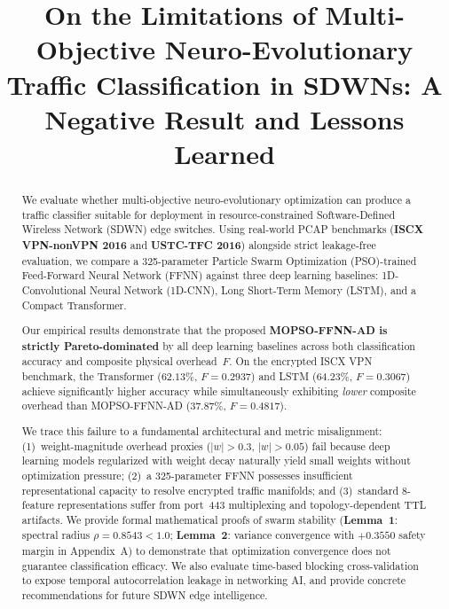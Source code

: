 \documentclass[journal]{IEEEtran}
\begin{document}
\title{On the Limitations of Multi-Objective Neuro-Evolutionary Traffic
Classification in SDWNs: A Negative Result and Lessons Learned}

\author{
}

\maketitle

\begin{abstract}
We evaluate whether multi-objective neuro-evolutionary optimization can produce
a traffic classifier suitable for deployment in resource-constrained
Software-Defined Wireless Network (SDWN) edge switches. Using real-world PCAP
benchmarks (\textbf{ISCX VPN-nonVPN 2016} and \textbf{USTC-TFC 2016})
alongside strict leakage-free evaluation, we compare a 325-parameter Particle
Swarm Optimization (PSO)-trained Feed-Forward Neural Network (FFNN) against
three deep learning baselines: 1D-Convolutional Neural Network (1D-CNN), Long
Short-Term Memory (LSTM), and a Compact Transformer.

Our empirical results demonstrate that the proposed \textbf{MOPSO-FFNN-AD is
strictly Pareto-dominated} by all deep learning baselines across both
classification accuracy and composite physical overhead~$F$. On the encrypted
ISCX VPN benchmark, the Transformer ($62.13\%$, $F{=}0.2937$) and LSTM
($64.23\%$, $F{=}0.3067$) achieve significantly higher accuracy while
simultaneously exhibiting \emph{lower} composite overhead than MOPSO-FFNN-AD
($37.87\%$, $F{=}0.4817$).

We trace this failure to a fundamental architectural and metric misalignment:
(1)~weight-magnitude overhead proxies ($|w|>0.3$, $|w|>0.05$) fail because
deep learning models regularized with weight decay naturally yield small weights
without optimization pressure; (2)~a 325-parameter FFNN possesses insufficient
representational capacity to resolve encrypted traffic manifolds; and
(3)~standard 8-feature representations suffer from port~443 multiplexing and
topology-dependent TTL artifacts. We provide formal mathematical proofs of
swarm stability (\textbf{Lemma~1}: spectral radius $\rho=0.8543<1.0$;
\textbf{Lemma~2}: variance convergence with $+0.3550$ safety margin in
Appendix~A) to demonstrate that optimization convergence does not guarantee
classification efficacy. We also evaluate time-based blocking cross-validation
to expose temporal autocorrelation leakage in networking AI, and provide
concrete recommendations for future SDWN edge intelligence.
\end{abstract}
\end{document}

